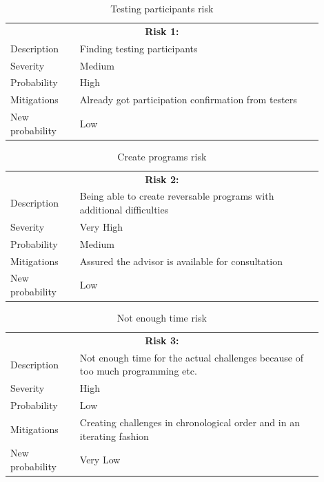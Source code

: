 \begin{table}[H]
  \centering
  \begin{tabular}{|p{0.2\linewidth}p{0.7\linewidth}|}
    \hline
    \multicolumn{2}{|c|}{\textbf{Risk 1:}}                     \\
    Description     & Finding testing participants           \\
    Severity        & Medium                                 \\
    Probability     & High                                   \\
    Mitigations     & Already got participation confirmation from testers  \\
    New probability & Low                                    \\
    \hline                           
  \end{tabular}
  \caption{Testing participants risk}
\end{table}

\vspace{2.5cm}

\begin{table}[H]
  \centering
  \begin{tabular}{|p{0.2\linewidth}p{0.7\linewidth}|}
    \hline
    \multicolumn{2}{|c|}{\textbf{Risk 2:}} \\
    Description     & Being able to create reversable programs with additional difficulties           \\
    Severity        & Very High                                 \\
    Probability     & Medium                                   \\
    Mitigations     & Assured the advisor is available for consultation  \\
    New probability & Low       \\
    \hline                            
  \end{tabular}
  \caption{Create programs risk}
\end{table}

\vspace{2.5cm}

\begin{table}[H]
  \centering
  \begin{tabular}{|p{0.2\linewidth}p{0.7\linewidth}|}
    \hline
    \multicolumn{2}{|c|}{\textbf{Risk 3:}} \\
    Description            & Not enough time for the actual challenges because of too much programming etc.           \\
    Severity        & High                                 \\
    Probability     & Low                                   \\
    Mitigations     & Creating challenges in chronological order and in an iterating fashion  \\
    New probability & Very Low     \\
    \hline                              
  \end{tabular}
  \caption{Not enough time risk}
\end{table}

